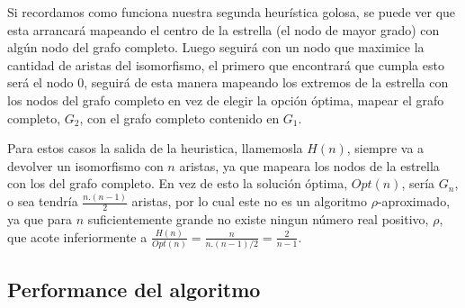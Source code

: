 
Si recordamos como funciona nuestra segunda heurística golosa, se puede ver que esta arrancará mapeando el centro de la estrella (el nodo de mayor grado) con algún nodo del grafo completo. Luego seguirá con un nodo que maximice la cantidad de aristas del isomorfismo, el primero que encontrará que cumpla esto será  el nodo 0, seguirá de esta manera mapeando los extremos de la estrella con los nodos del grafo completo en vez de elegir la opción óptima, mapear el grafo completo, $G_2$, con el grafo completo contenido en $G_1$.

Para estos casos la salida de la heuristica, llamemosla $H(n)$, siempre va a devolver un isomorfismo con $n$ aristas, ya que mapeara los nodos de la estrella con los del grafo completo. En vez de esto la solución óptima, $Opt(n)$, sería $G_n$, o sea tendría $\frac{n.(n-1)}{2}$ aristas, por lo cual este no es un algoritmo $\rho$-aproximado, ya que para $n$ suficientemente grande no existe ningun número real positivo, $\rho$, que acote inferiormente a $\frac{H(n)}{Opt(n)} = \frac{n}{n.(n-1)/2} = \frac{2}{n-1}$.

\subsection{Performance del algoritmo}


